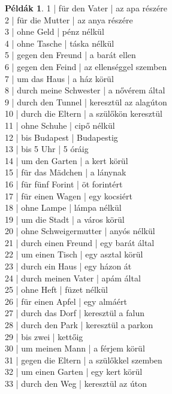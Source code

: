 \documentclass{article}
\theoremstyle{definition}
\newtheorem*{exmp}{Példák}
\begin{document}
\begin{exmp}
1 | für den Vater | az apa részére\\
2 | für die Mutter | az anya részére\\
3 | ohne Geld | pénz nélkül\\
4 | ohne Tasche | táska nélkül\\
5 | gegen den Freund | a barát ellen\\
6 | gegen den Feind | az ellenséggel szemben\\
7 | um das Haus | a ház körül\\
8 | durch meine Schwester | a nővérem által\\
9 | durch den Tunnel | keresztül az alagúton\\
10 | durch die Eltern | a szülőkön keresztül\\
11 | ohne Schuhe | cipő nélkül\\
12 | bis Budapest | Budapestig\\
13 | bis 5 Uhr | 5 óráig\\
14 | um den Garten | a kert körül\\
15 | für das Mädchen | a lánynak\\
16 | für fünf Forint | öt forintért\\
17 | für einen Wagen | egy kocsiért\\
18 | ohne Lampe | lámpa nélkül\\
19 | um die Stadt | a város körül\\
20 | ohne Schweigermutter | anyós nélkül\\
21 | durch einen Freund | egy barát által\\
22 | um einen Tisch | egy asztal körül\\
23 | durch ein Haus | egy házon át\\
24 | durch meinen Vater | apám által\\
25 | ohne Heft | füzet nélkül\\
26 | für einen Apfel | egy almáért\\
27 | durch das Dorf | keresztül a falun\\
28 | durch den Park | keresztül a parkon\\
29 | bis zwei | kettőig\\
30 | um meinen Mann | a férjem körül\\
31 | gegen die Eltern | a szülőkkel szemben\\
32 | um einen Garten | egy kert körül\\
33 | durch den Weg | keresztül az úton\\

\end{exmp}
\end{document}
